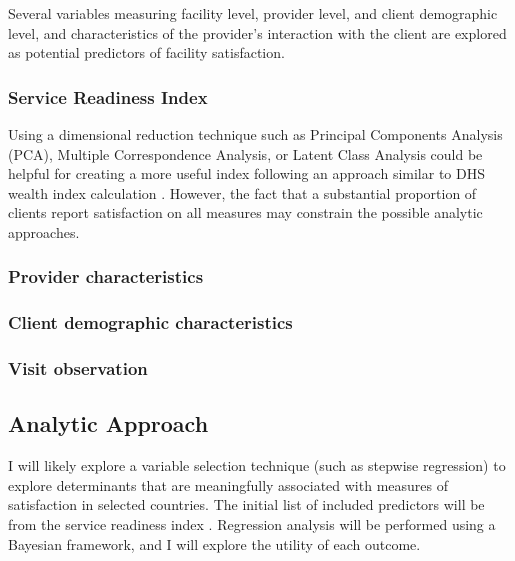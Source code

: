 Several variables measuring facility level, provider level, and client demographic level, and characteristics of the provider's interaction with the client are explored as potential predictors of facility satisfaction.

\subsubsection{Service Readiness Index}

Using a dimensional reduction technique such as Principal Components Analysis (PCA), Multiple Correspondence Analysis, or Latent Class Analysis could be helpful for creating a more useful index following an approach similar to DHS wealth index calculation \autocite{dhs_program_dhs_nodate}. However, the fact that a substantial proportion of clients report satisfaction on all measures may constrain the possible analytic approaches.

\subsubsection{Provider characteristics}

\subsubsection{Client demographic characteristics}

\subsubsection{Visit observation}

\subsection{Analytic Approach}

I will likely explore a variable selection technique (such as stepwise regression) to explore determinants that are meaningfully associated with measures of satisfaction in selected countries. The initial list of included predictors will be from the service readiness index \autocite{world_health_organization_service_2014}. Regression analysis will be performed using a Bayesian framework, and I will explore the utility of each outcome.